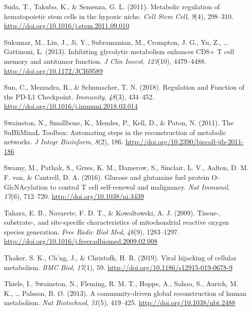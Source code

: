 \documentclass[12pt,twoside,openany,\mydriver]{thesis}  %
\begin{document}
\leavevmode\hypertarget{ref-suda_metabolic_2011}{}%
Suda, T., Takubo, K., \& Semenza, G. L. (2011). Metabolic regulation of hematopoietic stem cells in the hypoxic niche. \emph{Cell Stem Cell}, \emph{9}(4), 298--310. \url{http://doi.org/10.1016/j.stem.2011.09.010}

\leavevmode\hypertarget{ref-sukumar_inhibiting_2013}{}%
Sukumar, M., Liu, J., Ji, Y., Subramanian, M., Crompton, J. G., Yu, Z., \ldots{} Gattinoni, L. (2013). Inhibiting glycolytic metabolism enhances CD8+ T cell memory and antitumor function. \emph{J Clin Invest}, \emph{123}(10), 4479--4488. \url{http://doi.org/10.1172/JCI69589}

\leavevmode\hypertarget{ref-sun_regulation_2018}{}%
Sun, C., Mezzadra, R., \& Schumacher, T. N. (2018). Regulation and Function of the PD-L1 Checkpoint. \emph{Immunity}, \emph{48}(3), 434--452. \url{http://doi.org/10.1016/j.immuni.2018.03.014}

\leavevmode\hypertarget{ref-swainston_subliminal_2011}{}%
Swainston, N., Smallbone, K., Mendes, P., Kell, D., \& Paton, N. (2011). The SuBliMinaL Toolbox: Automating steps in the reconstruction of metabolic networks. \emph{J Integr Bioinform}, \emph{8}(2), 186. \url{http://doi.org/10.2390/biecoll-jib-2011-186}

\leavevmode\hypertarget{ref-swamy_glucose_2016}{}%
Swamy, M., Pathak, S., Grzes, K. M., Damerow, S., Sinclair, L. V., Aalten, D. M. F. van, \& Cantrell, D. A. (2016). Glucose and glutamine fuel protein O-GlcNAcylation to control T cell self-renewal and malignancy. \emph{Nat Immunol}, \emph{17}(6), 712--720. \url{http://doi.org/10.1038/ni.3439}

\leavevmode\hypertarget{ref-tahara_tissue-_2009}{}%
Tahara, E. B., Navarete, F. D. T., \& Kowaltowski, A. J. (2009). Tissue-, substrate-, and site-specific characteristics of mitochondrial reactive oxygen species generation. \emph{Free Radic Biol Med}, \emph{46}(9), 1283--1297. \url{http://doi.org/10.1016/j.freeradbiomed.2009.02.008}

\leavevmode\hypertarget{ref-thaker_viral_2019}{}%
Thaker, S. K., Ch'ng, J., \& Christofk, H. R. (2019). Viral hijacking of cellular metabolism. \emph{BMC Biol}, \emph{17}(1), 59. \url{http://doi.org/10.1186/s12915-019-0678-9}

\leavevmode\hypertarget{ref-thiele_community-driven_2013}{}%
Thiele, I., Swainston, N., Fleming, R. M. T., Hoppe, A., Sahoo, S., Aurich, M. K., \ldots{} Palsson, B. Ø. (2013). A community-driven global reconstruction of human metabolism. \emph{Nat Biotechnol}, \emph{31}(5), 419--425. \url{http://doi.org/10.1038/nbt.2488}
\end{document}
